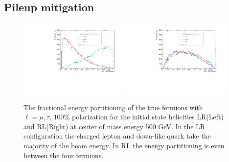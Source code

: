 \subsection{Pileup mitigation}
\label{subsec:Pileup_mitigation}
\begin{figure}
\label{fig:Epartition}
\includegraphics[width=0.48\textwidth]{hxLR.pdf}
\includegraphics[width=0.48\textwidth]{hxRL.pdf}
\caption{The fractional energy partitioning of the true fermions with $\ell = \mu,\tau$, $100\%$ polarization for the initial state helicities LR(Left) and RL(Right) at center of mass energy 500 GeV. In the LR configuration the charged lepton and down-like quark take the majority of the beam energy. In RL the energy partitioning is even between the four fermions. }
\end{figure}

